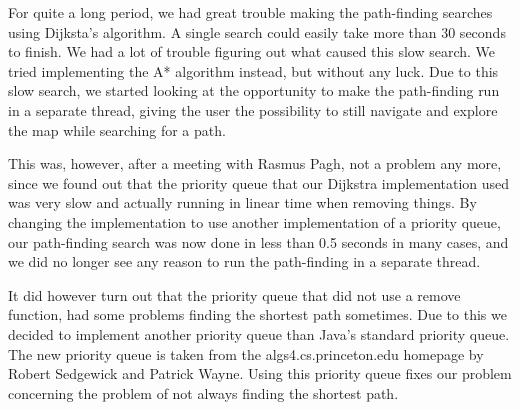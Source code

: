 For quite a long period, we had great trouble making the path-finding searches using Dijksta's algorithm. A single search could easily take more than 30 seconds to finish. We had a lot of trouble figuring out what caused this slow search. We tried implementing the A* algorithm instead, but without any luck. Due to this slow search, we started looking at the opportunity to make the path-finding run in a separate thread, giving the user the possibility to still navigate and explore the map while searching for a path. 

This was, however, after a meeting with Rasmus Pagh, not a problem any more, since we found out that the priority queue that our Dijkstra implementation used was very slow and actually running in linear time when removing things. By changing the implementation to use another implementation of a priority queue, our path-finding search was now done in less than 0.5 seconds in many cases, and we did no longer see any reason to run the path-finding in a separate thread.

It did however turn out that the priority queue that did not use a remove function, had some problems finding the shortest path sometimes. Due to this we decided to implement another priority queue than Java's standard priority queue. The new priority queue is taken from the algs4.cs.princeton.edu homepage by Robert Sedgewick and Patrick Wayne. Using this priority queue fixes our problem concerning the problem of not always finding the shortest path.
